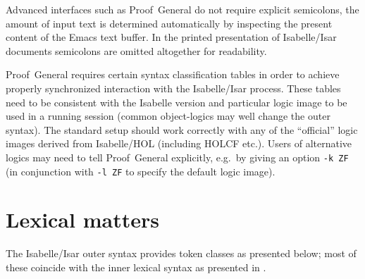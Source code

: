Advanced interfaces such as Proof~General \cite{proofgeneral} do not require
explicit semicolons, the amount of input text is determined automatically by
inspecting the present content of the Emacs text buffer.  In the printed
presentation of Isabelle/Isar documents semicolons are omitted altogether for
readability.

\begin{warn}
  Proof~General requires certain syntax classification tables in order to
  achieve properly synchronized interaction with the Isabelle/Isar process.
  These tables need to be consistent with the Isabelle version and particular
  logic image to be used in a running session (common object-logics may well
  change the outer syntax).  The standard setup should work correctly with any
  of the ``official'' logic images derived from Isabelle/HOL (including HOLCF
  etc.).  Users of alternative logics may need to tell Proof~General
  explicitly, e.g.\ by giving an option \verb,-k ZF, (in conjunction with
  \verb,-l ZF, to specify the default logic image).
\end{warn}

\section{Lexical matters}\label{sec:lex-syntax}

The Isabelle/Isar outer syntax provides token classes as presented below; most
of these coincide with the inner lexical syntax as presented in
\cite{isabelle-ref}.


